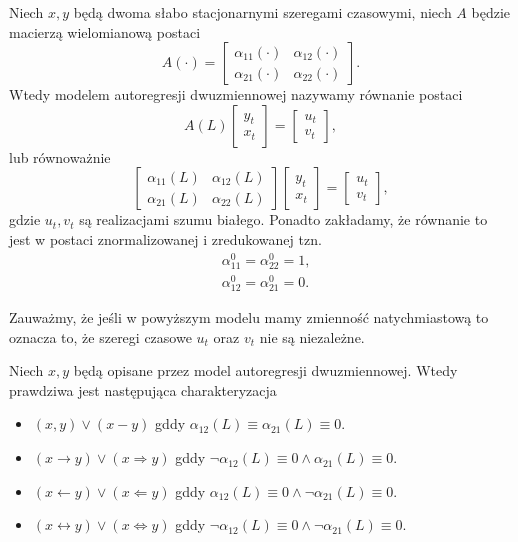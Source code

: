 \documentclass[10pt,a4paper]{book}
\begin{document}
\begin{definition}
Niech $x,y$ będą dwoma słabo stacjonarnymi szeregami czasowymi, niech $A$ będzie macierzą wielomianową postaci
$$
A(\cdot) = \begin{bmatrix}
\alpha_{11} (\cdot) & \alpha_{12} (\cdot)\\
\alpha_{21} (\cdot) & \alpha_{22} (\cdot)
\end{bmatrix}.
$$
Wtedy modelem autoregresji dwuzmiennowej nazywamy równanie postaci
$$
A(L) \begin{bmatrix}
y_t\\ x_t
\end{bmatrix} = \begin{bmatrix}
u_t \\ v_t
\end{bmatrix},
$$
lub równoważnie
$$
\begin{bmatrix}
\alpha_{11} (L) & \alpha_{12} (L)\\
\alpha_{21} (L) & \alpha_{22} (L)
\end{bmatrix} \begin{bmatrix}
y_t\\ x_t
\end{bmatrix} = \begin{bmatrix}
u_t \\ v_t
\end{bmatrix},
$$
gdzie $u_t, v_t$ są realizacjami szumu białego. Ponadto zakładamy, że równanie to jest w postaci znormalizowanej i zredukowanej tzn.
\begin{align*}
& \alpha_{11}^0 = \alpha_{22}^0 = 1,\\
& \alpha_{12}^0 = \alpha_{21}^0 = 0.
\end{align*}
\end{definition}

\begin{remark}
Zauważmy, że jeśli w powyższym modelu mamy zmienność natychmiastową to oznacza to, że szeregi czasowe $u_t$ oraz $v_t$ nie są niezależne. 
\end{remark}

\begin{theorem}
Niech $x,y$ będą opisane przez model autoregresji dwuzmiennowej. Wtedy prawdziwa jest następująca charakteryzacja
\begin{itemize}
\item $ (x,y) \lor (x-y)$ gddy $\alpha_{12}(L) \equiv \alpha_{21}(L) \equiv 0$.
\item $ (x \rightarrow y) \lor (x \Rightarrow y)$ gddy $ \lnot \alpha_{12}(L) \equiv 0 \land \alpha_{21}(L) \equiv 0$. 
\item $ (x \leftarrow y) \lor (x \Leftarrow y)$ gddy $  \alpha_{12}(L) \equiv 0 \land \lnot \alpha_{21}(L) \equiv 0$.
\item $ (x \leftrightarrow y) \lor (x \Leftrightarrow y)$ gddy $ \lnot \alpha_{12}(L) \equiv 0 \land \lnot \alpha_{21}(L) \equiv 0$.
\end{itemize}
\end{theorem}
\end{document}
